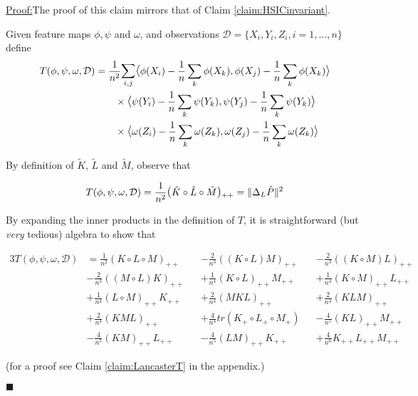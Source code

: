 \documentclass[12pt]{article}
\newenvironment{claimproof}[1]{\par\noindent\underline{Proof:}\space#1}{\hfill $\blacksquare$}
\numberwithin{claim}{section}
\numberwithin{lemma}{section}
\numberwithin{theorem}{section}
\begin{document}
\begin{claimproof}
The proof of this claim mirrors that of Claim \ref{claim:HSICinvariant}.

Given feature maps $\phi, \psi$ and $\omega$, and observations $\mathcal{D} = \{X_i, Y_i, Z_i, i=1,\ldots,n\}$ define
\begin{align*}
T(\phi,\psi,\omega,\mathcal{D}) &=
\frac{1}{n^2}\mathlarger{\sum}_{i,j}\mathlarger{\langle} \phi(X_i) - \frac{1}{n}\sum_k \phi(X_k), \phi(X_j) - \frac{1}{n}\sum_k \phi(X_k)  \mathlarger{\rangle}\\ & \quad \quad \times \mathlarger{\langle} \psi(Y_i) - \frac{1}{n}\sum_k \psi(Y_k), \psi(Y_j) - \frac{1}{n}\sum_k \psi(Y_k) \mathlarger{\rangle} \\ & \quad \quad  \times \mathlarger{\langle} \omega(Z_i) - \frac{1}{n}\sum_k \omega(Z_k), \omega(Z_j) - \frac{1}{n}\sum_k \omega(Z_k) \mathlarger{\rangle}
\end{align*}

By definition of $\tilde{K}$, $\tilde{L}$ and $\tilde{M}$, observe that

\begin{align*}
T(\phi,\psi,\omega,\mathcal{D}) &= \frac{1}{n^2}\mathlarger{(}\tilde{K}\circ\tilde{L}\circ\tilde{M}\mathlarger{)}_{++} = \|\Delta_L \hat{P}\|^2 \\
\end{align*}

By expanding the inner products in the definition of $T$, it is straightforward (but \emph{very} tedious) algebra to show that

\begin{alignat*}{3}
T(\phi,\psi,\omega,\mathcal{D}) &= \frac{1}{n^2}(K \circ L\circ M)_{++} && -
\frac{2}{n^3}((K\circ L) M)_{++} && - 
\frac{2}{n^3}((K \circ M) L)_{++} \\ & - 
\frac{2}{n^3}((M \circ L) K)_{++} && + 
\frac{1}{n^4}(K \circ L)_{++} M_{++} && + 
\frac{1}{n^4}(K \circ M)_{++} L_{++} \\ & + 
\frac{1}{n^4}(L \circ M)_{++} K_{++} && + 
\frac{2}{n^4}(MKL)_{++} && + 
\frac{2}{n^4}(KLM)_{++} \\& + 
\frac{2}{n^4}(KML)_{++} && + 
\frac{4}{n^4}tr(K_+ \circ L_+ \circ M_+) && -
\frac{4}{n^5}(K L)_{++} M_{++} \\ & - 
\frac{4}{n^5}(KM)_{++}L_{++} && - 
\frac{4}{n^5}(LM)_{++} K_{++} && +
\frac{4}{n^6}K_{++} L_{++} M_{++}
\end{alignat*}

(for a proof see Claim \ref{claim:LancasterT} in the appendix.)


\end{claimproof}
\end{document}
